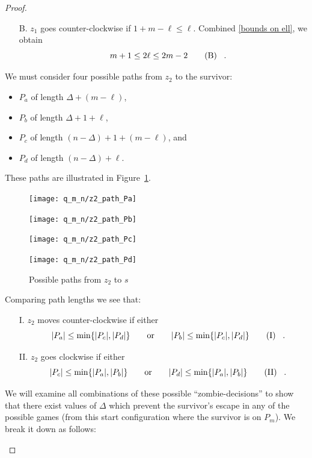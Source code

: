 \begin{proof}
\begin{proofpart}
\begin{itemize}
   \item[B.] $z_1$ goes counter-clockwise if $1 + m - \ell \leq \ell$.
         Combined \ref{bounds on ell}, we obtain
         \begin{equation}
           m + 1 \leq 2 \ell \leq 2m - 2 \tag{B} \label{assumption b} \mperiod
         \end{equation}

  \end{itemize}

  We must consider four possible paths from $z_2$ to the survivor:

  \begin{itemize}
   \item $P_a$ of length $\Delta + (m - \ell)$,
   \item $P_b$ of length $\Delta + 1 + \ell$,
   \item $P_c$ of length $(n-\Delta) + 1 + (m-\ell)$, and
   \item $P_d$ of length $(n-\Delta) + \ell$.
  \end{itemize}

  These paths are illustrated in Figure~\ref{fig:different_paths}.

  \begin{figure}
    \centering
    \texttt{[image: q\_m\_n/z2\_path\_Pa]}

    \texttt{[image: q\_m\_n/z2\_path\_Pb]}

    \texttt{[image: q\_m\_n/z2\_path\_Pc]}

    \texttt{[image: q\_m\_n/z2\_path\_Pd]}

    \caption{Possible paths from $z_2$ to $s$ \label{fig:different_paths}}
  \end{figure}

  Comparing path lengths we see that:

  \begin{itemize}
   \item[I.] $z_2$ moves counter-clockwise if either
   \[ |P_a| \leq \min \{ |P_c|, |P_d| \}\qquad \text{or} \qquad |P_b| \leq \min \{ |P_c|, |P_d| \} \tag{I} \label{assumption i} \mperiod \]

   \item[II.] $z_2$ goes clockwise if either
   \[ |P_c| \leq \min \{ |P_a|, |P_b| \}\qquad \text{or} \qquad |P_d| \leq \min \{ |P_a|, |P_b| \} \tag{II} \label{assumption ii}\mperiod \]
  \end{itemize}

  We will examine all combinations of these possible ``zombie-decisions'' to show that there exist values of $\Delta$ which prevent the survivor's escape in any of the possible games (from this start configuration where the survivor is on $P_m$). We break it down as follows:


\end{proofpart}
\end{proof}

